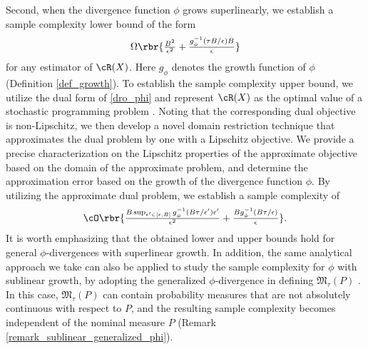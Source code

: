 \documentclass[9pt]{article} %
\numberwithin{equation}{section}
\renewcommand{\frac}[2]{\tfrac{#1}{#2}}
\begin{document}
Second, when the divergence function $\phi$ grows superlinearly, we establish a sample complexity lower bound 
of the form 
\begin{align}\label{intro_lower_suplinear}
\Omega \rbr{  {
 \frac{B^2}{\epsilon^2} +  \frac{ g_{\phi}^{-1} (\tau B / \epsilon) B }{  \epsilon } 
}
}
\end{align}
for any estimator of $\cR(X)$. 
Here $g_\phi$ denotes the growth function of $\phi$ (Definition \ref{def_growth}).
To establish the sample complexity upper bound, we utilize the dual form of \eqref{dro_phi} and represent $\cR(X)$ as the optimal value of a stochastic programming problem \cite{shapiro2017distributionally}.
Noting that the corresponding dual objective is non-Lipschitz, we then develop a novel domain restriction technique that approximates the dual problem by one with a Lipschitz objective.
We provide a precise characterization on the Lipschitz properties of the approximate objective based on the domain of the approximate problem, and determine the approximation error based on the growth of the divergence function $\phi$. 
By utilizing the approximate dual problem, we establish a sample complexity of 
\begin{align}\label{intro_upper_suplinear}
\cO \rbr{ \frac{ B \sup_{\epsilon' \in [\epsilon, B]}  g_{\phi}^{-1}(B\tau / \epsilon')
\epsilon' 
}{\epsilon^2}  +  \frac{  B g_{\phi}^{-1} (B\tau / \epsilon)}{\epsilon} }.
\end{align}
It is worth emphasizing that the obtained lower and upper bounds hold for general $\phi$-divergences with superlinear growth. 
In addition, the same analytical approach we take can also be applied to study the sample complexity for $\phi$ with sublinear growth, by adopting the generalized $\phi$-divergence in defining $\mathfrak{M}_\tau(P)$ \cite{csiszar1963informationstheoretische,ali1966general,kuhn2025distributionally}. In this case, $\mathfrak{M}_\tau (P)$ can contain probability measures that are not absolutely continuous with respect to $P$, and the resulting sample complexity becomes independent of the nominal measure $P$ (Remark \ref{remark_sublinear_generalized_phi}).
\end{document}
